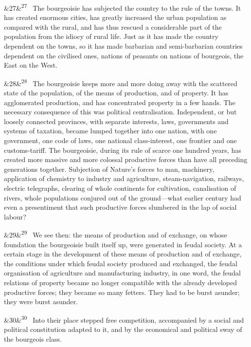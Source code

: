 \documentclass[12pt]{article}
\newcommand{\para}[1][]{\par\noindent\ifx&#1&\else\textsuperscript{\footnotesize #1}~\fi}
\begin{document}
\para[27] The bourgeoisie has subjected the country to the rule of the towns. It has created enormous cities, has greatly increased the urban population as compared with the rural, and has thus rescued a considerable part of the population from the idiocy of rural life. Just as it has made the country dependent on the towns, so it has made barbarian and semi-barbarian countries dependent on the civilised ones, nations of peasants on nations of bourgeois, the East on the West.

\para[28] The bourgeoisie keeps more and more doing away with the scattered state of the population, of the means of production, and of property. It has agglomerated production, and has concentrated property in a few hands. The necessary consequence of this was political centralisation. Independent, or but loosely connected provinces, with separate interests, laws, governments and systems of taxation, became lumped together into one nation, with one government, one code of laws, one national class-interest, one frontier and one customs-tariff. The bourgeoisie, during its rule of scarce one hundred years, has created more massive and more colossal productive forces than have all preceding generations together. Subjection of Nature's forces to man, machinery, application of chemistry to industry and agriculture, steam-navigation, railways, electric telegraphs, clearing of whole continents for cultivation, canalisation of rivers, whole populations conjured out of the ground---what earlier century had even a presentiment that such productive forces slumbered in the lap of social labour?

\para[29] We see then: the means of production and of exchange, on whose foundation the bourgeoisie built itself up, were generated in feudal society. At a certain stage in the development of these means of production and of exchange, the conditions under which feudal society produced and exchanged, the feudal organisation of agriculture and manufacturing industry, in one word, the feudal relations of property became no longer compatible with the already developed productive forces; they became so many fetters. They had to be burst asunder; they were burst asunder.

\para[30] Into their place stepped free competition, accompanied by a social and political constitution adapted to it, and by the economical and political sway of the bourgeois class.
\end{document}
